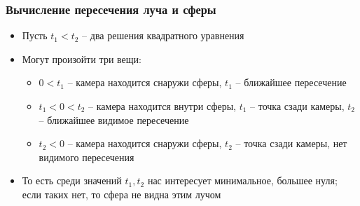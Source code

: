 \documentclass[10pt]{beamer}
\begin{document}
\begin{frame}
\frametitle{Вычисление пересечения луча и сферы}
\begin{itemize}
\item Пусть \begin{math}t_1 < t_2\end{math} -- два решения квадратного уравнения
\pause
\item Могут произойти три вещи:
\pause
\begin{itemize}
\item \begin{math}0 < t_1\end{math} -- камера находится снаружи сферы, \begin{math}t_1\end{math} -- ближайшее пересечение
\pause
\item \begin{math}t_1 < 0 < t_2\end{math} -- камера находится внутри сферы, \begin{math}t_1\end{math} -- точка сзади камеры, \begin{math}t_2\end{math} -- ближайшее видимое пересечение
\pause
\item \begin{math}t_2 < 0\end{math} -- камера находится снаружи сферы, \begin{math}t_2\end{math} -- точка сзади камеры, нет видимого пересечения
\end{itemize}
\pause
\item То есть среди значений \begin{math}t_1, t_2\end{math} нас интересует минимальное, большее нуля; если таких нет, то сфера не видна этим лучом
\end{itemize}
\end{frame}
\end{document}
